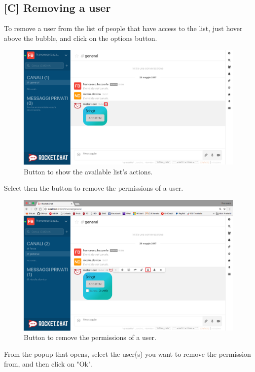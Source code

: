 \newpage
\subsection{[C] Removing a user}
To remove a user from the list of people that have access to the list, just hover above the bubble, and click on the options button.

\begin{figure}[H]
  \centering 
  \includegraphics[width=\textwidth]{Sections/3-HowToUse/Images/bubble_options_button.png}
  \caption{Button to show the available list's actions.}
\end{figure}

Select then the button to remove the permissions of a user.

\begin{figure}[H]
  \centering 
  \includegraphics[width=\textwidth]{Sections/3-HowToUse/Images/bubble_option_remove.png}
  \caption{Button to remove the permissions of a user.}
\end{figure}

From the popup that opens, select the user(s) you want to remove the permission from, and then click on "Ok".


